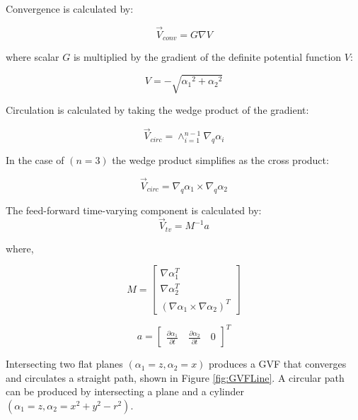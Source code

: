 \documentclass[conf]{new-aiaa}
\begin{document}
Convergence is calculated by:

\begin{equation}
\vec{V}_{conv} = G \nabla V  
\label{convOnly}
\end{equation}

where scalar $G$ is multiplied by the gradient of the definite potential function $V$:

\begin{equation}
V = -\sqrt{{\alpha_1}^2 + {\alpha_2}^2}
\end{equation}



Circulation is calculated by taking the wedge product of the gradient:

\begin{equation}
\vec{V}_{circ} =  \wedge_{i=1}^{n-1}\nabla_q\alpha_i 
\label{circOnly}
\end{equation}

In the case of $(n=3)$ the wedge product simplifies as the cross product:

\begin{equation}
\vec{V}_{circ} =  \nabla_q\alpha_1 \times \nabla_q\alpha_2 
\label{circOnlySimp}
\end{equation}

The feed-forward time-varying component is calculated by:
\begin{equation}
\label{tv}
\vec{V}_{tv} = M^{-1}a
\end{equation}

where,

\begin{equation}
\label{mMatrix}
M =\begin{bmatrix}
\nabla\alpha_1^T \\
\nabla\alpha_2^T \\
(\nabla\alpha_1 \times \nabla\alpha_2)^T
\end{bmatrix}
\end{equation}

\begin{equation}
\label{aVector}
a =\begin{bmatrix}
\frac{\partial \alpha_1}{\partial t} \quad   \frac{\partial \alpha_2}{\partial t} \quad   0
\end{bmatrix}^T
\end{equation}

Intersecting two flat planes $(\alpha_1 = z,\alpha_2 = x)$ produces a GVF that converges and circulates a straight path, shown in Figure \ref{fig:GVFLine}. A circular path can be produced by intersecting a plane and a cylinder $(\alpha_1 = z,\alpha_2 = x^2+y^2-r^2)$.
\end{document}
